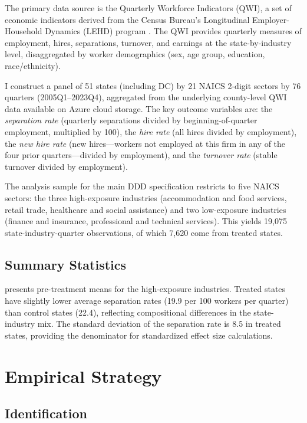 \documentclass[12pt]{article}
\begin{document}
The primary data source is the Quarterly Workforce Indicators (QWI), a set of economic indicators derived from the Census Bureau's Longitudinal Employer-Household Dynamics (LEHD) program \citep{abowd2009}. The QWI provides quarterly measures of employment, hires, separations, turnover, and earnings at the state-by-industry level, disaggregated by worker demographics (sex, age group, education, race/ethnicity).

I construct a panel of 51 states (including DC) by 21 NAICS 2-digit sectors by 76 quarters (2005Q1--2023Q4), aggregated from the underlying county-level QWI data available on Azure cloud storage. The key outcome variables are: the \textit{separation rate} (quarterly separations divided by beginning-of-quarter employment, multiplied by 100), the \textit{hire rate} (all hires divided by employment), the \textit{new hire rate} (new hires---workers not employed at this firm in any of the four prior quarters---divided by employment), and the \textit{turnover rate} (stable turnover divided by employment).

The analysis sample for the main DDD specification restricts to five NAICS sectors: the three high-exposure industries (accommodation and food services, retail trade, healthcare and social assistance) and two low-exposure industries (finance and insurance, professional and technical services). This yields 19,075 state-industry-quarter observations, of which 7,620 come from treated states.

\subsection{Summary Statistics}



 presents pre-treatment means for the high-exposure industries. Treated states have slightly lower average separation rates (19.9 per 100 workers per quarter) than control states (22.4), reflecting compositional differences in the state-industry mix. The standard deviation of the separation rate is 8.5 in treated states, providing the denominator for standardized effect size calculations.

\section{Empirical Strategy}

\subsection{Identification}
\end{document}
